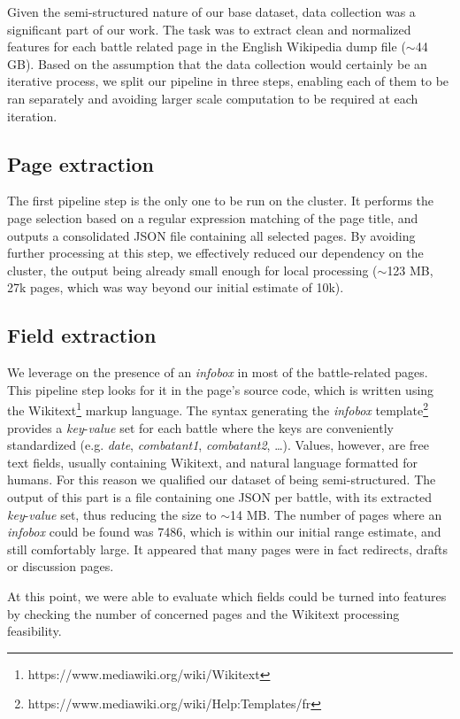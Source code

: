 Given the semi-structured nature of our base dataset, data collection was a significant part of our work. The task was to extract clean and normalized features for each battle related page in the English Wikipedia dump file ($\sim $44 GB). Based on the assumption that the data collection would certainly be an iterative process, we split our pipeline in three steps, enabling each of them to be ran separately and avoiding larger scale computation to be required at each iteration.

\subsection{Page extraction}
The first pipeline step is the only one to be run on the cluster. It performs the page selection based on a regular expression matching of the page title, and outputs a consolidated JSON file containing all selected pages. By avoiding further processing at this step, we effectively reduced our dependency on the cluster, the output being already small enough for local processing ($\sim $123 MB, 27k pages, which was way beyond our initial estimate of 10k).

\subsection{Field extraction}
We leverage on the presence of an \textit{infobox} in most of the battle-related pages. This pipeline step looks for it in the page's source code, which is written using the Wikitext\footnote{https://www.mediawiki.org/wiki/Wikitext} markup language. The syntax generating the \textit{infobox} template\footnote{https://www.mediawiki.org/wiki/Help:Templates/fr} provides a \textit{key}-\textit{value} set for each battle where the keys are conveniently standardized (e.g. \textit{date}, \textit{combatant1}, \textit{combatant2}, \dots).   Values, however, are free text fields, usually containing Wikitext, and natural language formatted for humans. For this reason we qualified our dataset of being semi-structured. The output of this part is a file containing one JSON per battle, with its extracted \textit{key}-\textit{value} set, thus reducing the size to $\sim $14 MB. The number of pages where an \textit{infobox} could be found was 7486, which is within our initial range estimate, and still comfortably large. It appeared that many pages were in fact redirects, drafts or discussion pages.  

At this point, we were able to evaluate which fields could be turned into features by checking the number of concerned pages and the Wikitext processing feasibility. 

